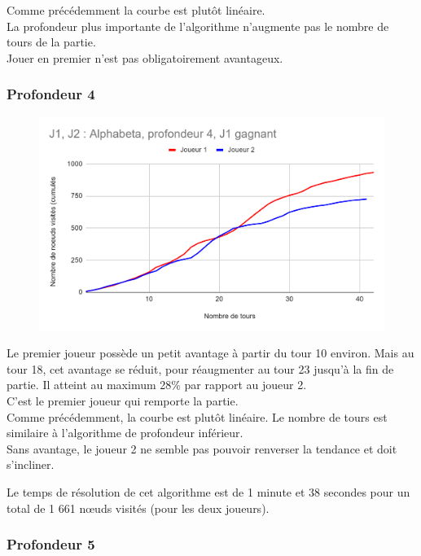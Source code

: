 \documentclass[12pt]{article}
\begin{document}
Comme précédemment la courbe est plutôt linéaire.\\
La profondeur plus importante de l'algorithme n'augmente pas le nombre de tours de la partie.\\
Jouer en premier n'est pas obligatoirement avantageux.
\newpage
\subsubsection{Profondeur 4}

\begin{figure}[!h]
   \includegraphics[width=\textwidth]{prof4alphabeta.png}
\end{figure}

Le premier joueur possède un petit avantage à partir du tour 10 environ. Mais au tour 18, cet avantage se réduit, pour réaugmenter au tour 23 jusqu'à la fin de partie. Il atteint au maximum 28\% par rapport au joueur 2.\\
C'est le premier joueur qui remporte la partie.\\

Comme précédemment, la courbe est plutôt linéaire. Le nombre de tours est similaire à l'algorithme de profondeur inférieur.\\
Sans avantage, le joueur 2 ne semble pas pouvoir renverser la tendance et doit s'incliner.

Le temps de résolution de cet algorithme est de 1 minute et 38 secondes pour un total de 1 661 nœuds visités (pour les deux joueurs).

\newpage
\subsubsection{Profondeur 5}
\end{document}

